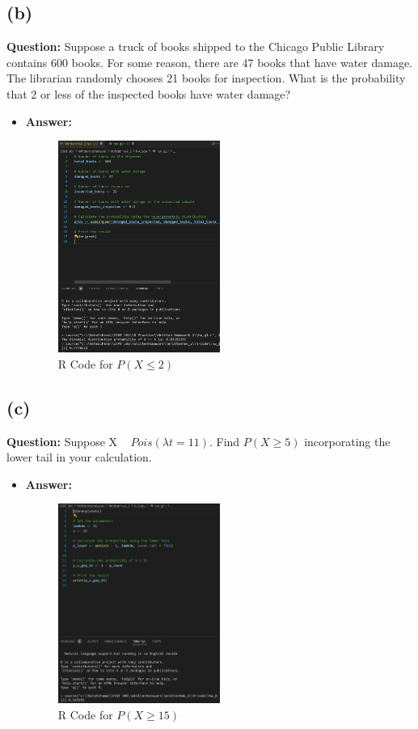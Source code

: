 \documentclass{article}
\begin{document}
\subsection*{(b)} \textbf{Question:} Suppose a truck of books shipped to the Chicago Public Library contains 600 books.
For some reason, there are 47 books that have water damage. The librarian randomly
chooses 21 books for inspection. What is the probability that 2 or less of the inspected
books have water damage?
\begin{itemize}
    \item[] \textbf{Answer:} 
    \begin{figure}[h]
        \centering
        \includegraphics[width=0.5\textwidth]{RHW2.6.b.png}
        \caption{R Code for $P(X \leq 2)$}
        \label{fig:RHW2.6.b}
    \end{figure}
\end{itemize}
\newpage
\subsection*{(c)} \textbf{Question:} Suppose X ~ $Pois(\lambda t = 11)$. Find $P(X \geq 5)$ incorporating the lower tail in your calculation.
\begin{itemize}
    \item[] \textbf{Answer:} 
    \begin{figure}[h]
        \centering
        \includegraphics[width=0.5\textwidth]{RHW2.6.c.png}
        \caption{R Code for $P(X \geq 15)$}
        \label{fig:RHW2.6.c}
    \end{figure}
\end{itemize}
\newpage
\end{document}
